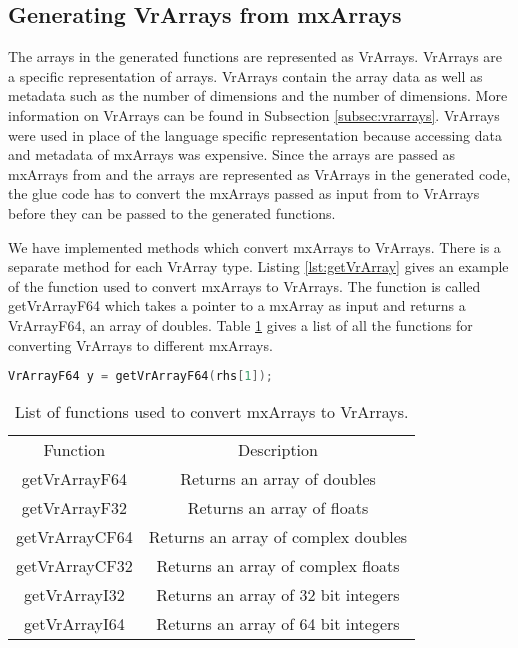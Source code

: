 \subsection{Generating VrArrays from mxArrays}
The arrays in the generated functions are represented as VrArrays. VrArrays are a \velocty specific representation of arrays. VrArrays contain the array data as well as metadata such as the number of dimensions and the number of dimensions. More information on VrArrays can be found in Subsection \ref{subsec:vrarrays}. VrArrays were used in place of the language specific representation because accessing data and metadata of mxArrays was expensive. Since the arrays are passed as mxArrays from \matlab and the arrays are represented as VrArrays in the generated code, the glue code has to convert the mxArrays passed as input from \matlab to VrArrays before they can be passed to the generated functions. 

We have implemented methods which convert mxArrays to VrArrays. There is a separate method for each VrArray type. Listing \ref{lst:getVrArray} gives an example of the function used to convert mxArrays to VrArrays. The function is called getVrArrayF64 which takes a pointer to a mxArray as input and returns a VrArrayF64, an array of doubles. Table \ref{tab:getVrArray} gives a list of all the functions for converting VrArrays to different mxArrays. 

\begin{lstlisting}[language=c,caption={Converting mxArrays to VrArrays},label={lst:getVrArray}]
VrArrayF64 y = getVrArrayF64(rhs[1]);
\end{lstlisting}

\begin{table}[htbp]
\centering
\begin{tabular}{|c|c|}
\hline
Function       & Description                         \\ \hhline{|=|=|}
getVrArrayF64  & Returns an array of doubles         \\ \hline
getVrArrayF32  & Returns an array of floats          \\ \hline
getVrArrayCF64 & Returns an array of complex doubles \\ \hline
getVrArrayCF32 & Returns an array of complex floats  \\ \hline
getVrArrayI32  & Returns an array of 32 bit integers \\ \hline
getVrArrayI64  & Returns an array of 64 bit integers  \\ \hline
\end{tabular}
\caption{List of functions used to convert mxArrays to VrArrays.}
\label{tab:getVrArray}
\end{table}

